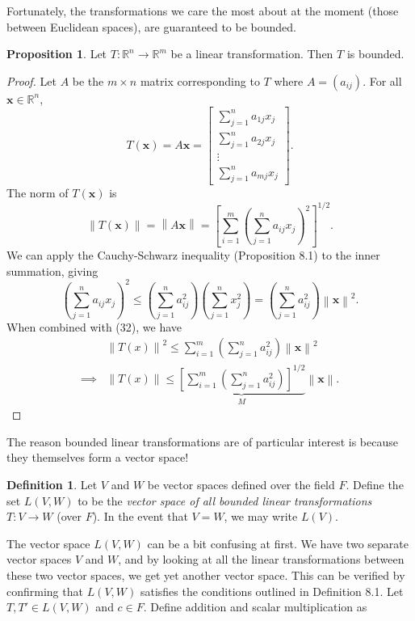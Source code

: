 \documentclass{article}
\newcommand{\R}{\mathbb{R}}
\newcommand{\x}{\mathbf{x}}
\newcommand{\norm}[1]{\left\lVert#1\right\rVert}
\theoremstyle{definition}
\newtheorem{proposition}{Proposition}[section]
\newtheorem{definition}{Definition}[section]
\begin{document}
Fortunately, the transformations we care the most about at the moment (those between Euclidean spaces), are guaranteed to be bounded.
\begin{proposition}
	Let $ T:\R^n\to\R^m $ be a linear transformation. Then $ T $ is bounded. 
\end{proposition}
\begin{proof}
	Let $ A $ be the $ m\times n $ matrix corresponding to $ T $ where $ A = (a_{ij}) $. For all $ \x\in \R^n $, $$ T(\x) = A\x = \begin{bmatrix}
		\sum_{j=1}^{n}a_{1j}x_j\\
		\sum_{j=1}^{n}a_{2j}x_j\\\vdots \\ 
		\sum_{j=1}^{n}a_{mj}x_j
	\end{bmatrix} .$$
The norm of $ T(\x) $ is 
\begin{equation}\label{key}
	\norm{T(\x)} = \norm{A\x} =\left[ \sum_{i=1}^{m}\left(\sum_{j=1}^{n}a_{ij}x_j\right)^2\right]^{1/2} .
\end{equation}
We can apply the Cauchy-Schwarz inequality (Proposition 8.1) to the inner summation, giving 
$$ \left(\sum_{j=1}^{n}a_{ij}x_j\right)^2 \le \left(\sum_{j=1}^{n}a_{ij}^2\right) \left(\sum_{j=1}^{n}x_j^2\right)= \left(\sum_{j=1}^{n}a_{ij}^2\right) \norm{\x}^2 .$$ When combined with (32), we have 
\begin{align*}
 &\norm{T(x)} ^2\le  \sum_{i=1}^{m} \left(\sum_{j=1}^{n}a_{ij}^2\right)\norm{\x}^2\\
 \implies& \norm{T(x)} \le \underbrace{\left[ \sum_{i=1}^{m} \left(\sum_{j=1}^{n}a_{ij}^2\right)\right]^{1/2}}_M\norm{\x} .
\end{align*}
\end{proof}
The reason bounded linear transformations are of particular interest is because they themselves form a vector space!
\begin{definition}
	Let $ V $ and $ W $ be vector spaces defined over the field $ F $. Define the set $ L(V,W) $ to be the \textit{\color{red}vector space of all bounded linear transformations} $ T:V\to W $ (over $ F $). In the event that $ V =W $, we may write $ L(V) $. 
\end{definition}
The vector space $ L(V,W) $ can be a bit confusing at first. We have two separate vector spaces $ V $ and $ W $, and by looking at all the linear transformations between these two vector spaces, we get yet another vector space. This can be verified by confirming that $ L(V,W) $ satisfies the conditions outlined in Definition 8.1. Let $ T,T'\in L(V,W) $ and $ c\in F $. Define addition and scalar multiplication as 
\end{document}
